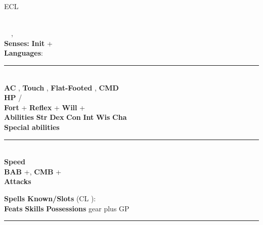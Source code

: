\documentclass[article,10pt]{memoir}
\newcommand{\hr}{\vspace{-1.5ex}\rule{\linewidth}{0.4pt}}
\newcommand{\afterenum}{\everypar{\parindent=0pt\hangindent=1em}}
\newcounter{skillmod}
\newcounter{abilitymod}
\newcounter{classmod}
\newcommand{\skill}[6]{
 \ifthenelse{\equal{#2}{Str}}{
 \setcounter{abilitymod}{\value{strmod}}
}{\ifthenelse{\equal{#2}{Dex}}{
 \setcounter{abilitymod}{\value{dexmod}}
}{\ifthenelse{\equal{#2}{Con}}{
 \setcounter{abilitymod}{\value{conmod}}
}{\ifthenelse{\equal{#2}{Int}}{
 \setcounter{abilitymod}{\value{intmod}}
}{\ifthenelse{\equal{#2}{Wis}}{
 \setcounter{abilitymod}{\value{wismod}}
}{\ifthenelse{\equal{#2}{Cha}}{
 \setcounter{abilitymod}{\value{chamod}}
}{
}}}}}}
\ifthenelse{\equal{#1}{Perception}}{
\setcounter{classmod}{\minof{#3}{#5}*3}
\setcounter{skillmod}{#3+\value{abilitymod}+#4+\value{classmod}}
#1 +\arabic{skillmod}
}{}}
\begin{document}




{\LARGE \charname \large\hfill ECL  }

\begin{multicols}{2}
\begingroup
{}\selectfont
\raggedright
\afterenum
\charrace \ \charclass \\
\charalignment \ \charsize \ \chartype, \\
\textbf{Senses:}  \textbf{Init} +\\
\renewcommand{\skill}[6]{
 \ifthenelse{\equal{#2}{Str}}{
 \setcounter{abilitymod}{\value{strmod}}
}{\ifthenelse{\equal{#2}{Dex}}{
 \setcounter{abilitymod}{\value{dexmod}}
}{\ifthenelse{\equal{#2}{Con}}{
 \setcounter{abilitymod}{\value{conmod}}
}{\ifthenelse{\equal{#2}{Int}}{
 \setcounter{abilitymod}{\value{intmod}}
}{\ifthenelse{\equal{#2}{Wis}}{
 \setcounter{abilitymod}{\value{wismod}}
}{\ifthenelse{\equal{#2}{Cha}}{
 \setcounter{abilitymod}{\value{chamod}}
}{
}}}}}}
\ifthenelse{#3 = 0}{}{
\setcounter{classmod}{\minof{#3}{#5}*3}
\setcounter{skillmod}{#3+\value{abilitymod}+#4+\value{classmod}}
#1 +\arabic{skillmod}
}}
\textbf{Languages}: \languages 
\hr \\
\textbf{AC} , \textbf{Touch} , \textbf{Flat-Footed} , \textbf{CMD} \\
\textbf{HP} / \\
\textbf{Fort} + \textbf{Reflex} + \textbf{Will} +\\
\textbf{Abilities} \textbf{Str}  \textbf{Dex}  \textbf{Con}  \textbf{Int}  \textbf{Wis}  \textbf{Cha} \\
\textbf{Special abilities} \specialabilities 
\hr \\
\textbf{Speed} \speed \\
\textbf{BAB} +, \textbf{CMB} +\\
\textbf{Attacks}

\textbf{Spells Known/Slots} (CL ):\\
\spellsknown
\textbf{Feats}
\feats
\textbf{Skills}  
\textbf{Possessions} gear plus GP\\

\hr \\
\afterenum
\end{multicols}

\endgroup
\end{document}
